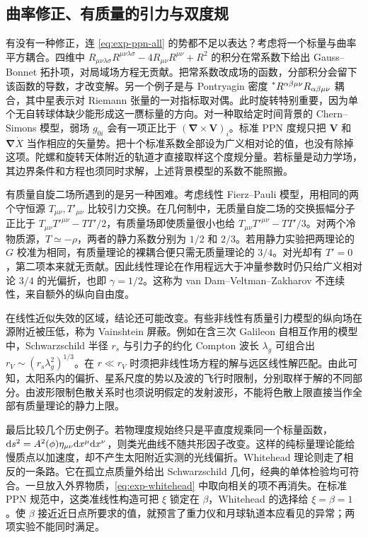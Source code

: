\subsection{曲率修正、有质量的引力与双度规}

有没有一种修正，连 \eqref{eq:exp-ppn-all} 的势都不足以表达？考虑将一个标量与曲率平方耦合。四维中 $R_{\mu\nu\lambda\sigma}R^{\mu\nu\lambda\sigma}-4R_{\mu\nu}R^{\mu\nu}+R^2$ 的积分在常系数下给出 Gauss--Bonnet 拓扑项，对局域场方程无贡献。把常系数改成场的函数，分部积分会留下该函数的导数，才改变解。另一个例子是与 Pontryagin 密度 $\prescript{*}{}{R}^{\alpha\beta\mu\nu}R_{\alpha\beta\mu\nu}$ 耦合，其中星表示对 Riemann 张量的一对指标取对偶。此时旋转特别重要，因为单个无自转球体缺少能形成这一赝标量的方向。对一种取给定时间背景的 Chern--Simons 模型，弱场 $g_{0i}$ 会有一项正比于 $(\bm\nabla\times\bm V)_i$。标准 PPN 度规只把 $\bm V$ 和 $\bm\nabla\dot X$ 当作相应的矢量势。把十个标准系数全部设为广义相对论的值，也没有除掉这项。陀螺和旋转天体附近的轨道才直接取样这个度规分量。若标量是动力学场，其边界条件和方程也须同时求解，上述背景模型的系数不能照搬。

有质量自旋二场所遇到的是另一种困难。考虑线性 Fierz--Pauli 模型，用相同的两个守恒源 $T_{\mu\nu},T'_{\mu\nu}$ 比较引力交换。在几何制中，无质量自旋二场的交换振幅分子正比于 $T_{\mu\nu}T'^{\mu\nu}-TT'/2$，有质量场即使质量很小也给 $T_{\mu\nu}T'^{\mu\nu}-TT'/3$。对两个冷物质源，$T\simeq-\rho$，两者的静力系数分别为 $1/2$ 和 $2/3$。若用静力实验把两理论的 $G$ 校准为相同，有质量理论的裸耦合便只需无质量理论的 $3/4$。对光却有 $T'=0$，第二项本来就无贡献。因此线性理论在作用程远大于冲量参数时仍只给广义相对论 $3/4$ 的光偏折，也即 $\gamma=1/2$。这称为 van Dam--Veltman--Zakharov 不连续性，来自额外的纵向自由度。

在线性近似失效的区域，结论还可能改变。有些非线性有质量引力模型的纵向场在源附近被压低，称为 Vainshtein 屏蔽。例如在含三次 Galileon 自相互作用的模型中，Schwarzschild 半径 $r_s$ 与引力子的约化 Compton 波长 $\lambda_g$ 可组合出 $r_V\sim(r_s\lambda_g^2)^{1/3}$。在 $r\ll r_V$ 时须把非线性场方程的解与远区线性解匹配。由此可知，太阳系内的偏折、星系尺度的势以及波的飞行时限制，分别取样于解的不同部分。由波形限制色散关系时也须说明假定的发射波形，不能将色散上限直接当作全部有质量理论的静力上限。

最后比较几个历史例子。若物理度规始终只是平直度规乘同一个标量函数，$\dd s^2=A^2(\phi)\eta_{\mu\nu}\dd x^\mu\dd x^\nu$，则类光曲线不随共形因子改变。这样的纯标量理论能给慢质点以加速度，却不产生太阳附近实测的光线偏折。Whitehead 理论则走了相反的一条路。它在孤立点质量外给出 Schwarzschild 几何，经典的单体检验均可符合。一旦放入外界物质，\eqref{eq:exp-whitehead} 中取向相关的项不再消失。在标准 PPN 规范中，这类准线性构造可把 $\xi$ 锁定在 $\beta$，Whitehead 的选择给 $\xi=\beta=1$。使 $\beta$ 接近近日点所要求的值，就预言了重力仪和月球轨道本应看见的异常；两项实验不能同时满足。

